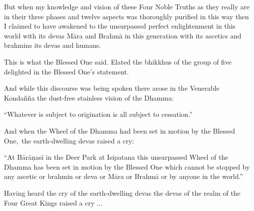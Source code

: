 \medskip

\begin{english-only-hang}
  But when my knowledge and vision of these Four Noble Truths as they really are in their three phases and twelve aspects was thoroughly purified in this way then I claimed to have awakened to the unsurpassed perfect enlightenment in this world with its devas Māra and Brahmā in this generation with its ascetics and brahmins its devas and humans.
\end{english-only-hang}

\medskip

\begin{english-only-hang}
  This is what the Blessed One said. Elated the bhikkhus of the group of five delighted in the Blessed One's statement.
\end{english-only-hang}

\medskip

\begin{english-only-hang}
  And while this discourse was being spoken there arose in the Venerable Kondañña the dust-free stainless vision of the Dhamma:
\end{english-only-hang}

\medskip

\begin{english-only-hang}
  ``Whatever is subject to origination is all subject to cessation.''
\end{english-only-hang}

\medskip

\begin{english-only-hang}
  And when the Wheel of the Dhamma had been set in motion by the Blessed One, the earth-dwelling devas raised a cry:
\end{english-only-hang}

\medskip

\begin{english-only-hang}
  ``At Bārāṇasī in the Deer Park at Isipatana this unsurpassed Wheel of the Dhamma has been set in motion by the Blessed One which cannot be stopped by any ascetic or brahmin or deva or Māra or Brahmā or by anyone in the world.''
\end{english-only-hang}

\medskip

\begin{english-only-hang}
  Having heard the cry of the earth-dwelling devas the devas of the realm of the Four Great Kings raised a cry ...
\end{english-only-hang}

